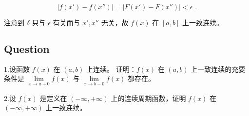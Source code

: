 $$
\vert f(x')-f(x'')\vert=\vert F(x')-F(x'')\vert<\epsilon~.
$$

注意到 $\delta$ 只与 $\epsilon$ 有关而与 $x',x''$ 无关，故 $f(x)$ 在 $[a,b]$ 上一致连续。

\subsection{Question}

1.设函数 $f(x)$ 在 $(a,b)$ 上连续。 证明：$f(x)$ 在 $(a,b)$ 上一致连续的充要条件是 $\lim\limits_{x\rightarrow a+0}f(x)$ 与 $\lim\limits_{x\rightarrow b-0}f(x)$ 都存在。

2.设 $f(x)$ 是定义在 $(-\infty,+\infty)$ 上的连续周期函数，证明 $f(x)$ 在 $(-\infty,+\infty)$ 上一致连续。

